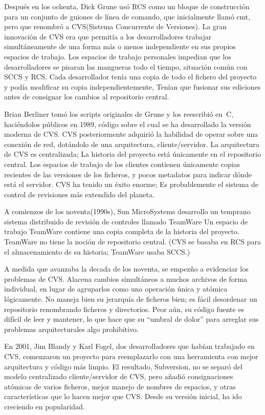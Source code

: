 Después en los ochenta, Dick Grune usó RCS como un bloque de
construcción para un conjunto de guiones de línea de comando, que
inicialmente llamó cmt, pero que renombró a CVS(Sistema Concurrente de
Versiones).  La gran innovación de CVS era que permitía a los
desarrolladores trabajar simultáneamente de una forma más o menos
independiente en sus propios espacios de trabajo. Los espacios de
trabajo personales impedian que los desarrolladores se pisaran las
mangueras todo el tiempo, situación común con SCCS y RCS.  Cada
desarrollador tenía una copia de todo el fichero del proyecto y podía
modificar su copia independientemente, Tenían que fusionar sus
ediciones antes de consignar los cambios al repositorio central.

Brian Berliner tomó los scripts originales de Grune y los reescribió
en~C, haciéndolos públicos en 1989, código sobre el cual se ha
desarrollado la versión moderna de CVS.  CVS posteriormente adquirió
la habilidad de operar sobre una conexión de red, dotándolo de una
arquitectura, cliente/servidor. La arquitectura de CVS es
centralizada; La historia del proyecto está únicamente en el
repositorio central.  Los espacios de trabajo de los clientes
contienen únicamente copias recientes de las versiones de los
ficheros, y pocos metadatos para indicar dónde está el servidor. CVS
ha tenido un éxito enorme; Es probablemente el sistema de control de
revisiones más extendido del planeta.

A comienzos de los noventa(1990s), Sun MicroSystems desarrollo un
temprano sistema distribuido de revisión de controles llamado TeamWare
Un espacio de trabajo TeamWare contiene una copia completa de la
historia del proyecto. TeamWare no tiene la noción de repositorio
central. (CVS se basaba en RCS para el almacenamiento de su historia;
TeamWare usaba SCCS.)

A medida que avanzaba la decada de los noventa, se empezño a
evidenciar los problemas de CVS.  Alacena cambios simultáneos a muchos
archivos de forma individual, en lugar de agruparlos como una
operación única y atómica lógicamente.  No maneja bien su jerarquía de
ficheros bien; es fácil desordenar un repositorio renombrando ficheros
y directorios. Peor aún, su código fuente es difícil de leer y
mantener, lo que hace que su ``umbral de dolor'' para arreglar sus
problemas arquitecturales algo prohibitivo.

En 2001, Jim Blandy y Karl Fogel, dos desarrolladores que habían
trabajado en CVS, comenzaron un proyecto para reemplazarlo con una
herramienta con mejor arquitectura y código más limpio.  El resultado,
Subversion, no se separó del modelo centralizado cliente/servidor de
CVS, pero añadió consignaciones atómicas de varios ficheros, mejor
manejo de nombres de espacios, y otras características que lo hacen
mejor que CVS. Desde su versión inicial, ha ido creciendo en
popularidad.

